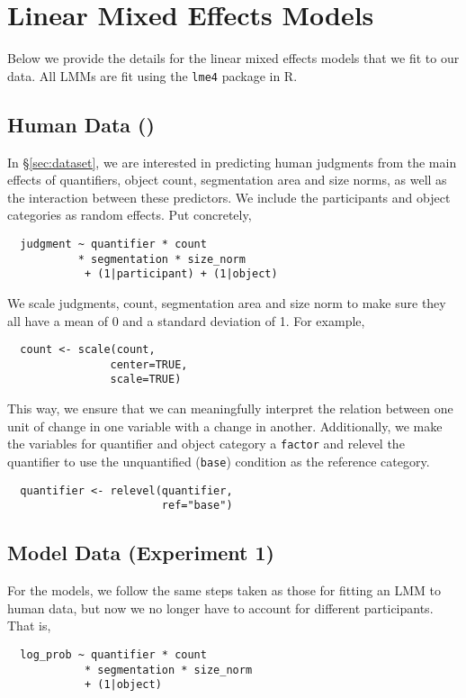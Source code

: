 \section{Linear Mixed Effects Models}\label{appendix:lmms}
Below we provide the details for the linear mixed effects models that we fit to our data.
All LMMs are fit using the \verb|lme4| package in R. 

\subsection{Human Data (\dataset)}
In \S\ref{sec:dataset}, we are interested in predicting human judgments from the main effects of quantifiers, object count, segmentation area and size norms, as well as the interaction between these predictors.
We include the participants and object categories as random effects. Put concretely, 

\begin{verbatim}
  judgment ~ quantifier * count 
           * segmentation * size_norm 
            + (1|participant) + (1|object)
\end{verbatim}

We scale judgments, count, segmentation area and size norm to make sure they all have a mean of 0 and a standard deviation of 1. For example,
\begin{verbatim}
  count <- scale(count,
                center=TRUE,
                scale=TRUE)
\end{verbatim}
\noindent
This way, we ensure that we can meaningfully interpret the relation between one unit of change in one variable with a change in another.
Additionally, we make the variables for quantifier and object category a \verb|factor| and relevel the quantifier to use the unquantified (\verb|base|) condition as the reference category.
\begin{verbatim}
  quantifier <- relevel(quantifier,
                        ref="base")
\end{verbatim}


\subsection{Model Data (Experiment 1)}
For the models, we follow the same steps taken as those for fitting an LMM to human data, but now we no longer have to account for different participants.
That is, 

\begin{verbatim}
  log_prob ~ quantifier * count 
            * segmentation * size_norm 
            + (1|object)
\end{verbatim}

